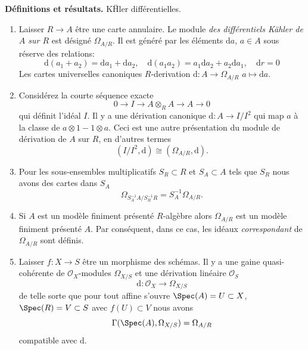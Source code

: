 \noindent
{\bf Définitions et résultats.} K\"Hler différentielles.
\begin{enumerate}
\item Laisser $R \to A$ être une carte annulaire. Le module
{\it des différentiels K\"ahler de $A$ sur $R$} est désigné $\Omega_{A/R}$.
Il est généré par les éléments $\text{d}a$, $a \in
A$ sous réserve des relations:
$$
\text{d}(a_1 + a_2) = \text{d}a_1 + \text{d}a_2,\quad
\text{d}(a_1a_2) = a_1\text{d}a_2 + a_2\text{d}a_1,\quad
\text{d}r = 0
$$
Les cartes universelles canoniques $R$-derivation $\text{d} : A \to
\Omega_{A/R}$ $a\mapsto \text{d}a$.
\item Considérez la courte séquence exacte
$$
0 \to I \to A \otimes_R A \to A \to 0
$$
qui définit l'idéal $I$. Il y a une dérivation canonique $\text{d} :
A \to I/I^2$ qui map $a$ à la classe de
$a \otimes 1 - 1 \otimes a$. Ceci est une autre présentation
du module de dérivation de $A$ sur $R$, en d'autres termes
$$
(I/I^2, \text{d}) \cong (\Omega_{A/R}, \text{d}).
$$
\item Pour les sous-ensembles multiplicatifs $S_R \subset R$ et $S_A
\subset A$ tels que $S_R$ nous avons des cartes dans $S_A$
$$
\Omega_{S_A^{-1}A / S_R^{-1}R} =
S_A^{-1}\Omega_{A/R}.
$$
\item Si $A$ est un modèle finiment présenté $R$-algèbre
alors $\Omega_{A/R}$ est un modèle finiment présenté $A$. Par conséquent,
dans ce cas, les idéaux {\it correspondant} de $\Omega_{A/R}$ sont définis.
\item Laisser $f : X \to S$ être un morphisme
des schémas. Il y a une gaine quasi-cohérente de ${\mathcal O}_X$-modules
$\Omega_{X/S}$ et une dérivation linéaire ${\mathcal O}_S$
$$
\text{d} : {\mathcal O}_X \longrightarrow \Omega_{X/S}
$$
de telle sorte que pour tout affine s'ouvre $\Spec(A) = U \subset
X$, $\Spec(R) = V \subset S$
avec $f(U) \subset V$ nous avons
$$
\Gamma(\Spec(A), \Omega_{X/S}) = \Omega_{A/R}
$$
compatible avec $\text{d}$.
\end{enumerate}

